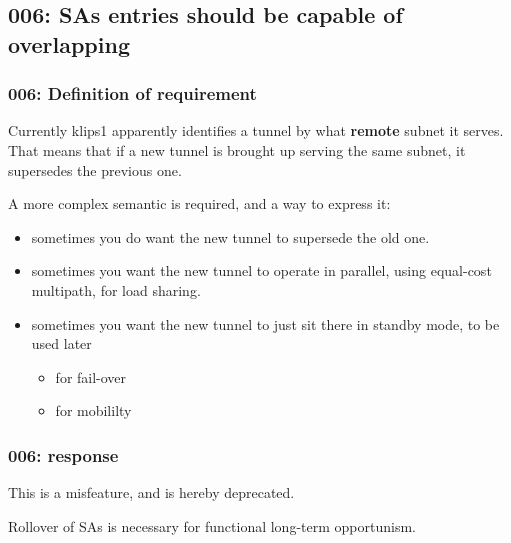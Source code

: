 \subsection{006: SAs entries should be capable of overlapping}

\subsubsection{006: Definition of requirement }

Currently klips1 apparently identifies a tunnel by what {\bf remote} subnet it 
serves.  That means that if a new tunnel is brought up serving the same 
subnet, it supersedes the previous one.

A more complex semantic is required, and a way to express it:

\begin{itemize}
\item sometimes you do want the new tunnel to supersede the old one.
\item sometimes you want the new tunnel to operate in parallel, using 
	equal-cost multipath, for load sharing.
\item sometimes you want the new tunnel to just sit there in standby mode, 
	to be used later
\begin{itemize}
\item for fail-over
\item for mobililty
\end{itemize}
\end{itemize}

\subsubsection{006: response}

This is a misfeature, and is hereby deprecated.

Rollover of SAs is necessary for functional long-term opportunism.

%




